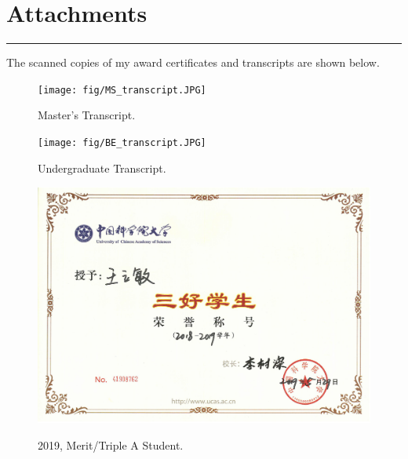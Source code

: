 \documentclass[11pt]{article}
\begin{document}

\section*{Attachments} \label{section:sec_attach}

\vspace{-0.6cm}
\rule[0.1pt]{\textwidth}{1pt}

The scanned copies of my award certificates and transcripts are shown below.

\begin{figure}[ht]
	\centering
	\texttt{[image: fig/MS\_transcript.JPG]}\\
	\caption{Master's Transcript.}
\end{figure}
	
\begin{figure}[ht]
	\centering
	\texttt{[image: fig/BE\_transcript.JPG]}\\
	\caption{Undergraduate Transcript.}
\end{figure}

\begin{figure}[ht]
	\centering
	\includegraphics[width=14cm]{fig/cer1.jpg}\\
	\caption{2019, Merit/Triple A Student.}
\end{figure}
\end{document}
